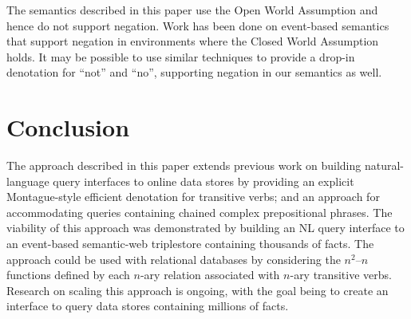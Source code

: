 \documentclass[../main.tex]{subfiles}
\begin{document}
\begin{refsection}
The semantics described in this paper use the Open World Assumption and hence do not support negation.  Work has been done on event-based semantics that support negation \cite{champollion2010quantification} in environments where the Closed World Assumption holds. It may be possible to use similar techniques to provide a drop-in denotation for ``not'' and ``no'', supporting negation in our semantics as well.


\section{Conclusion}
The approach described in this paper extends previous work on building natural-language query interfaces to online data stores by providing an explicit Montague-style efficient denotation for transitive verbs; and an approach for accommodating queries containing chained complex prepositional phrases. The viability of this approach was demonstrated by building an NL query interface to an event-based semantic-web triplestore containing thousands of facts. The approach could be used with relational databases by considering the $n^2 – n$ functions defined by each $n$-ary relation associated with $n$-ary transitive verbs. Research on scaling this approach is ongoing, with the goal being to create an interface to query data stores containing millions of facts.






%



\end{refsection}
\end{document}
